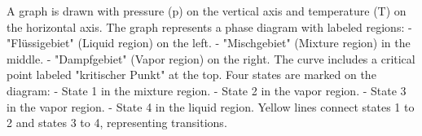 A graph is drawn with pressure (p) on the vertical axis and temperature (T) on the horizontal axis. The graph represents a phase diagram with labeled regions:  
- "Flüssigebiet" (Liquid region) on the left.  
- "Mischgebiet" (Mixture region) in the middle.  
- "Dampfgebiet" (Vapor region) on the right.  
The curve includes a critical point labeled "kritischer Punkt" at the top.  
Four states are marked on the diagram:  
- State 1 in the mixture region.  
- State 2 in the vapor region.  
- State 3 in the vapor region.  
- State 4 in the liquid region.  
Yellow lines connect states 1 to 2 and states 3 to 4, representing transitions.
